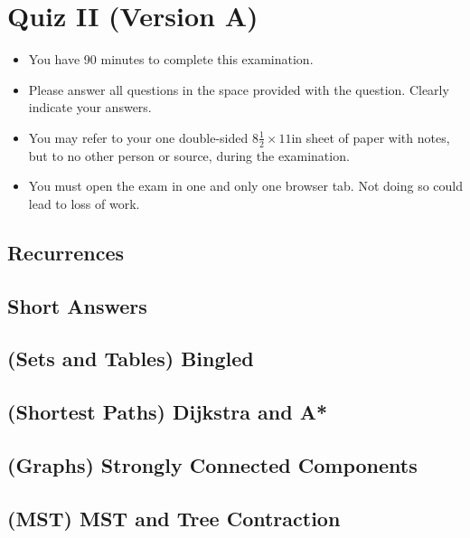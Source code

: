 \chapter{Quiz II (Version A)}
\label{ch:quiz}

\begin{preamble}
\begin{itemize}
\item You have 90 minutes to complete this examination.
\item Please answer all questions in the space provided with the
  question.  Clearly indicate your answers.
\item You may refer to your one double-sided $8\frac{1}{2} \times 11$in
  sheet of paper with notes, but to no other person or source, during the
  examination.

\item You must open the exam in one and only one browser tab.  Not doing so could lead to loss of work.

\end{itemize}
\end{preamble}

%

\newpage
\section{Recurrences}


\newpage
\section{Short Answers}







\newpage
\section{(Sets and Tables) Bingled}


\newpage
\section{(Shortest Paths) Dijkstra and A*}


\newpage
\section{(Graphs) Strongly Connected Components}


\newpage
\section{(MST) MST and Tree Contraction}

